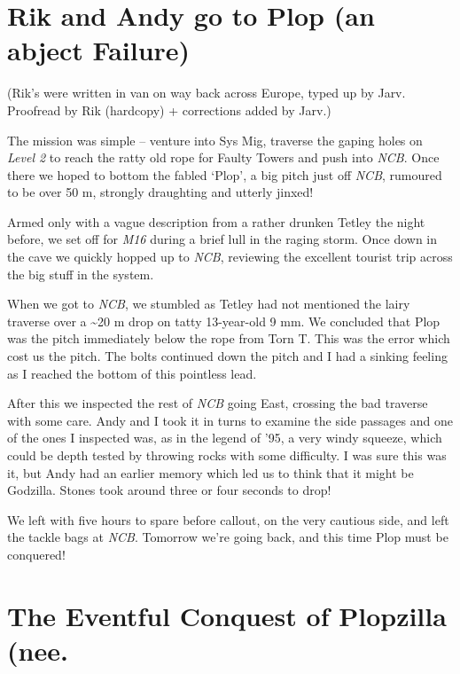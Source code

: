 
\hypertarget{rik-and-andy-go-to-plop-an-abject-failure}{%
\section{Rik and Andy go to Plop (an abject
Failure)}\label{rik-and-andy-go-to-plop-an-abject-failure}}

(Rik's were written in van on way back across Europe, typed up by Jarv.
Proofread by Rik (hardcopy) + corrections added by Jarv.)

The mission was simple -- venture into Sys Mig, traverse the gaping
holes on \emph{Level 2} to reach the ratty old rope for Faulty Towers
and push into \emph{NCB}. Once there we hoped to bottom the fabled
`Plop', a big pitch just off \emph{NCB}, rumoured to be over 50 m,
strongly draughting and utterly jinxed!

Armed only with a vague description from a rather drunken Tetley the
night before, we set off for \emph{M16} during a brief lull in the
raging storm. Once down in the cave we quickly hopped up to \emph{NCB},
reviewing the excellent tourist trip across the big stuff in the system.

When we got to \emph{NCB}, we stumbled as Tetley had not mentioned the
lairy traverse over a \textasciitilde{}20 m drop on tatty 13-year-old 9
mm. We concluded that Plop was the pitch immediately below the rope from
Torn T. This was the error which cost us the pitch. The bolts continued
down the pitch and I had a sinking feeling as I reached the bottom of
this pointless lead.

After this we inspected the rest of \emph{NCB} going East, crossing the
bad traverse with some care. Andy and I took it in turns to examine the
side passages and one of the ones I inspected was, as in the legend of
'95, a very windy squeeze, which could be depth tested by throwing rocks
with some difficulty. I was sure this was it, but Andy had an earlier
memory which led us to think that it might be Godzilla. Stones took
around three or four seconds to drop!

We left with five hours to spare before callout, on the very cautious
side, and left the tackle bags at \emph{NCB}. Tomorrow we're going back,
and this time Plop must be conquered!


\hypertarget{the-eventful-conquest-of-plopzilla-nee.}{%
\section{The Eventful Conquest of Plopzilla
(nee.}\label{the-eventful-conquest-of-plopzilla-nee.}}

